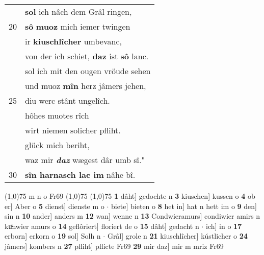 \documentclass[8pt,a4paper,notitlepage]{article}
\begin{document}
\begin{table}[ht]
\begin{minipage}[t]{0.5\linewidth}
\begin{tabular}{rl}
 & \textbf{sol} ich nâch dem Grâl ringen,\\ 
20 & \textbf{sô} \textbf{muoz} mich iemer twingen\\ 
 & ir \textbf{kiuschlîcher} umbevanc,\\ 
 & von der ich schiet, \textbf{daz} ist \textbf{sô} lanc.\\ 
 & sol ich mit den ougen vröude sehen\\ 
 & und muoz \textbf{mîn} herz jâmers jehen,\\ 
25 & diu werc stânt ungelîch.\\ 
 & hôhes muotes rîch\\ 
 & wirt niemen solicher pfliht.\\ 
 & glück mich beriht,\\ 
 & waz mir \textit{\textbf{daz}} wægest dâr umb sî."\\ 
30 & \textbf{sîn harnasch lac im} nâhe bî.\\ 
\end{tabular}
\scriptsize
\line(1,0){75} \newline
m n o Fr69 \newline
\line(1,0){75} \newline
\newline
\line(1,0){75} \newline
\textbf{1} dâht] gedochte n \textbf{3} kiuschen] kussen o \textbf{4} ob er] Aber o \textbf{5} dienst] dienste m o  $\cdot$ biete] bieten o \textbf{8} het in] hat n hett im o \textbf{9} den] sin n \textbf{10} ander] anders m \textbf{12} wan] wenne n \textbf{13} Condwieramurs] condiwier amirs n kuͯnwier amurs o \textbf{14} geflôriert] floriert de o \textbf{15} dâht] gedacht n  $\cdot$ ich] in o \textbf{17} erborn] erkorn o \textbf{19} sol] Solh n  $\cdot$ Grâl] grole n \textbf{21} kiuschlîcher] kústlicher o \textbf{24} jâmers] kombers n \textbf{27} pfliht] pflicte Fr69 \textbf{29} mir daz] mir m mriz Fr69 \newline
\end{minipage}
\end{table}
\newpage
\end{document}
